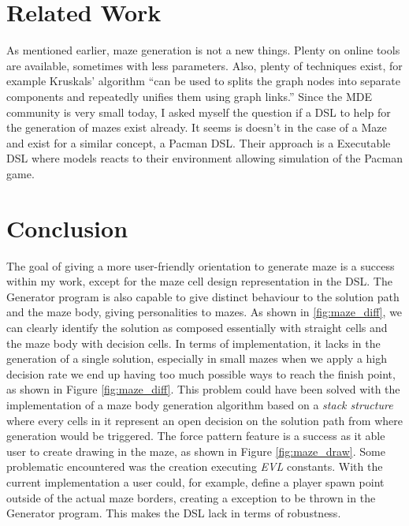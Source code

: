 \documentclass[review]{elsarticle}
\begin{document}
\section{Related Work}
As mentioned earlier, maze generation is not a new things. Plenty on online tools are available, sometimes with less parameters\cite{noauthor_maze_nodate}. Also, plenty of techniques exist, for example Kruskals’ algorithm ``can be used to splits the graph nodes into separate components and repeatedly unifies them using graph links\cite{bouda_day_2017}.'' Since the MDE community is very small today, I asked myself the question if a DSL to help for the generation of mazes exist already. It seems is doesn't in the case of a Maze and exist for a similar concept, a Pacman DSL\cite{leroy_create_nodate}. Their approach is a Executable DSL where models reacts to their environment allowing simulation of the Pacman game.

\section{Conclusion}
The goal of giving a more user-friendly orientation to generate maze is a success within my work, except for the maze cell design representation in the DSL. The Generator program is also capable to give distinct behaviour to the solution path and the maze body, giving personalities to mazes. As shown in  \ref{fig:maze_diff}, we can clearly identify the solution as composed essentially with straight cells and the maze body with decision cells. In terms of implementation, it lacks in the generation of a single solution, especially in small mazes when we apply a high decision rate we end up having too much possible ways to reach the finish point, as shown in Figure \ref{fig:maze_diff}. This problem could have been solved with the implementation of a maze body generation algorithm based on a \textit{stack structure} where every cells in it represent an open decision on the solution path from where generation would be triggered. The force pattern feature is a success as it able user to create drawing in the maze, as shown in Figure  \ref{fig:maze_draw}. Some problematic encountered was the creation executing \textit{EVL} constants. With the current implementation a user could, for example, define a player spawn point outside of the actual maze borders, creating a exception to be thrown in the Generator program. This makes the DSL lack in terms of robustness.


\end{document}

